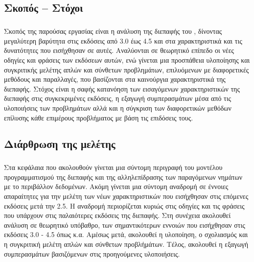 \newpage
\subsection{Σκοπός – Στόχοι}
\subparagraph{}
Σκοπός της παρούσας εργασίας είναι η ανάλυση της διεπαφής του \emph{}, δίνοντας μεγαλύτερη βαρύτητα στις εκδόσεις από 3.0 έως 4.5 και στα χαρακτηριστικά και τις δυνατότητες που εισήχθησαν σε αυτές. Αναλύονται σε θεωρητικό επίπεδο οι νέες οδηγίες και φράσεις των εκδόσεων αυτών, ενώ γίνεται μια προσπάθεια υλοποίησης και συγκριτικής μελέτης απλών και σύνθετων προβλημάτων, επιλυόμενων με διαφορετικές μεθόδους και παραλλαγές, που βασίζονται στα καινούργια χαρακτηριστικά της διεπαφής. Στόχος είναι η σαφής κατανόηση των εισαγόμενων χαρακτηριστικών της διεπαφής στις συγκεκριμένες εκδόσεις, η εξαγωγή συμπερασμάτων μέσα από τις υλοποιήσεις των προβλημάτων αλλά και η σύγκριση των διαφορετικών μεθόδων επίλυσης κάθε επιμέρους προβλήματος με βάση τις επιδόσεις τους.

\subsection{Διάρθρωση της μελέτης}
\subparagraph{}
Στα κεφάλαια που ακολουθούν γίνεται μια σύντομη περιγραφή του μοντέλου προγραμματισμού της διεπαφής \emph{} και της αλληλεπίδρασης των παραγόμενων νημάτων με το περιβάλλον δεδομένων. Ακόμη γίνεται μια σύντομη αναδρομή σε έννοιες απαραίτητες για την μελέτη των νέων χαρακτηριστικών που εισήχθησαν στις επόμενες εκδόσεις μετά την 2.5.
Η αναδρομή περιορίζεται κυριώς στις οδηγίες και τις φράσεις που υπάρχουν στις παλαιότερες εκδόσεις της διεπαφής.
Στη συνέχεια ακολουθεί ανάλυση σε θεωρητικό υπόβαθρο, των σημαντικότερων εννοιών που εισήχθησαν στις εκδόσεις 3.0 - 4.5 όπως \emph{} κ.α.
Αμέσως μετά, ακολουθεί η υλοποίηση, ο σχολιασμός και η συγκριτική μελέτη απλών και σύνθετων προβλήμάτων. Τέλος, ακολουθεί η εξαγωγή συμπερασμάτων βασιζόμενων στις προηγούμενες υλοποιήσεις.